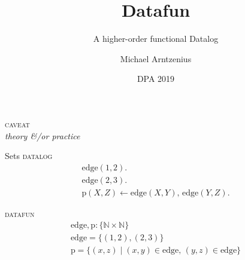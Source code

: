 \documentclass[aspectratio=2013,dvipsnames,fleqn]{beamer}
\title{Datafun}
\subtitle{A higher-order functional Datalog}
\author{Michael Arntzenius}
\institute{University of Birmingham}
\date{DPA 2019}
\providecommand\EMPH\textsc
\newcommand\x\times
\newcommand\N{\mathbb{N}}
\newcommand\kw\textbf
\newcommand\name\text
\newcommand\tset[1]{\{{#1}\}}
\newcommand\eset[1]{\{{#1}\}}
\newcommand\esetfor[2]{\eset{{#1} \mathrel{|} {#2}}}
\newcommand\efor[1]{\kw{for}\;{#1}\;\kw{do}\;}
\newcommand\ewhen[1]{\kw{when}\;{#1}\;\kw{do}\;}
\newcommand\shaded{\color{Gray}}
\newcommand\DATALOG{\EMPH{datalog}}
\newcommand\DATAFUN{\EMPH{datafun}}
\begin{document}
\maketitle

\Large

\begin{frame}{}
  \centering \huge
  \EMPH{caveat}
  \\[1ex]
  \itshape
  {theory}
  \&/or
  {practice}
\end{frame}



\begin{frame}{Sets}\setlength\mathindent{.67em}
  \DATALOG%
  \[
  \begin{array}{l}
    \name{edge}(1,2).\\\name{edge}(2,3).\\
    \name{p}(X,Z) \gets \name{edge}(X,Y),\, \name{edge}(Y,Z).
  \end{array}
  \]
  \vspace{0pt} %

  \DATAFUN%
  \[
  \begin{array}{l}
    \name{edge}, \name{p} : \tset{\N \x \N}\\
    \name{edge} = \eset{(1,2), (2,3)}\\
    \name{p} =
    \esetfor{(x,z)}{(x,y) \in \name{edge},\, (y,z) \in \name{edge}}
  \end{array}
  \]
  \vfill
\end{frame}
\end{document}
